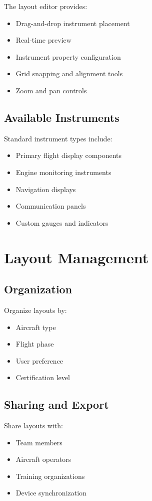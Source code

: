 The layout editor provides:
\begin{itemize}
    \item Drag-and-drop instrument placement
    \item Real-time preview
    \item Instrument property configuration
    \item Grid snapping and alignment tools
    \item Zoom and pan controls
\end{itemize}

\subsection{Available Instruments}

Standard instrument types include:
\begin{itemize}
    \item Primary flight display components
    \item Engine monitoring instruments
    \item Navigation displays
    \item Communication panels
    \item Custom gauges and indicators
\end{itemize}

\section{Layout Management}

\subsection{Organization}

Organize layouts by:
\begin{itemize}
    \item Aircraft type
    \item Flight phase
    \item User preference
    \item Certification level
\end{itemize}

\subsection{Sharing and Export}

Share layouts with:
\begin{itemize}
    \item Team members
    \item Aircraft operators
    \item Training organizations
    \item Device synchronization
\end{itemize}
